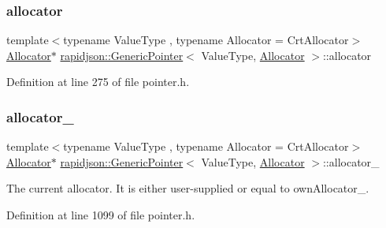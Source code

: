 \subsubsection{\texorpdfstring{allocator}{allocator}}
{\footnotesize\ttfamily template$<$typename Value\+Type , typename Allocator  = Crt\+Allocator$>$ \\
\mbox{\hyperlink{classrapidjson_1_1_allocator}{Allocator}}$\ast$ \mbox{\hyperlink{classrapidjson_1_1_generic_pointer}{rapidjson\+::\+Generic\+Pointer}}$<$ Value\+Type, \mbox{\hyperlink{classrapidjson_1_1_allocator}{Allocator}} $>$\+::allocator}



Definition at line 275 of file pointer.\+h.

\mbox{\label{classrapidjson_1_1_generic_pointer_a303e16e7d6c391a2afe8669744f79897}} 
\subsubsection{\texorpdfstring{allocator\_}{allocator\_}}
{\footnotesize\ttfamily template$<$typename Value\+Type , typename Allocator  = Crt\+Allocator$>$ \\
\mbox{\hyperlink{classrapidjson_1_1_allocator}{Allocator}}$\ast$ \mbox{\hyperlink{classrapidjson_1_1_generic_pointer}{rapidjson\+::\+Generic\+Pointer}}$<$ Value\+Type, \mbox{\hyperlink{classrapidjson_1_1_allocator}{Allocator}} $>$\+::allocator\+\_\+}



The current allocator. It is either user-\/supplied or equal to own\+Allocator\+\_\+. 



Definition at line 1099 of file pointer.\+h.

\mbox{\label{classrapidjson_1_1_generic_pointer_a38f23dc869001b53149804e563f6a465}} 
